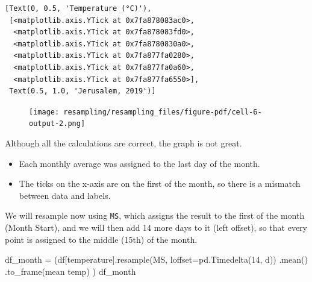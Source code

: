 \documentclass[
  letterpaper,
  DIV=11,
  numbers=noendperiod,
  oneside]{scrreprt}
\newenvironment{Shaded}{\begin{snugshade}}{\end{snugshade}}
\newcommand{\DecValTok}[1]{\textcolor[rgb]{0.68,0.00,0.00}{#1}}
\newcommand{\NormalTok}[1]{\textcolor[rgb]{0.00,0.23,0.31}{#1}}
\newcommand{\OperatorTok}[1]{\textcolor[rgb]{0.37,0.37,0.37}{#1}}
\newcommand{\StringTok}[1]{\textcolor[rgb]{0.13,0.47,0.30}{#1}}
\providecommand{\tightlist}{%
  \setlength{\itemsep}{0pt}\setlength{\parskip}{0pt}}\usepackage{longtable,booktabs,array}
\begin{document}
\begin{verbatim}
[Text(0, 0.5, 'Temperature (°C)'),
 [<matplotlib.axis.YTick at 0x7fa878083ac0>,
  <matplotlib.axis.YTick at 0x7fa878083fd0>,
  <matplotlib.axis.YTick at 0x7fa8780830a0>,
  <matplotlib.axis.YTick at 0x7fa877fa0280>,
  <matplotlib.axis.YTick at 0x7fa877fa0a60>,
  <matplotlib.axis.YTick at 0x7fa877fa6550>],
 Text(0.5, 1.0, 'Jerusalem, 2019')]
\end{verbatim}

\begin{figure}[H]

{\centering \texttt{[image: resampling/resampling\_files/figure-pdf/cell-6-output-2.png]}

}

\end{figure}

Although all the calculations are correct, the graph is not great.

\begin{itemize}
\tightlist
\item
  Each monthly average was assigned to the last day of the month.
\item
  The ticks on the x-axis are on the first of the month, so there is a
  mismatch between data and labels.
\end{itemize}

We will resample now using \texttt{MS}, which assigns the result to the
first of the month (Month Start), and we will then add 14 more days to
it (left offset), so that every point is assigned to the middle (15th)
of the month.

\begin{Shaded}
\begin{Highlighting}[]
\NormalTok{df\_month }\OperatorTok{=}\NormalTok{ (df[}\StringTok{\textquotesingle{}temperature\textquotesingle{}}\NormalTok{].resample(}\StringTok{\textquotesingle{}MS\textquotesingle{}}\NormalTok{,}
\NormalTok{                                       loffset}\OperatorTok{=}\NormalTok{pd.Timedelta(}\DecValTok{14}\NormalTok{, }\StringTok{\textquotesingle{}d\textquotesingle{}}\NormalTok{))}
\NormalTok{                             .mean()}
\NormalTok{                             .to\_frame(}\StringTok{\textquotesingle{}mean temp\textquotesingle{}}\NormalTok{)}
\NormalTok{           )}
\NormalTok{df\_month}
\end{Highlighting}
\end{Shaded}
\end{document}
